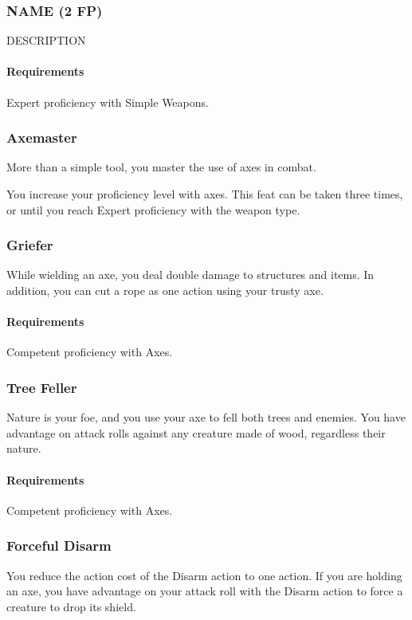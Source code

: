 \subsubsection{NAME (2 FP)} \label{feat::name}
    DESCRIPTION
    \paragraph{Requirements} Expert proficiency with Simple Weapons.

\subsubsection{Axemaster} \label{feat::axemaster}
    More than a simple tool, you master the use of axes in combat.

    You increase your proficiency level with axes.
    This feat can be taken three times, or until you reach Expert proficiency with the weapon type.
\subsubsection{Griefer} \label{feat::griefer}
    While wielding an axe, you deal double damage to structures and items.
    In addition, you can cut a rope as one action using your trusty axe.
    \paragraph{Requirements} Competent proficiency with Axes.
\subsubsection{Tree Feller} \label{feat::treefeller}
    Nature is your foe, and you use your axe to fell both trees and enemies.
    You have advantage on attack rolls against any creature made of wood, regardless their nature.
    \paragraph{Requirements} Competent proficiency with Axes.
\subsubsection{Forceful Disarm} \label{feat::forcefuldisarm}
    You reduce the action cost of the Disarm action to one action.
    If you are holding an axe, you have advantage on your attack roll with the Disarm action to force a creature to drop its shield.
